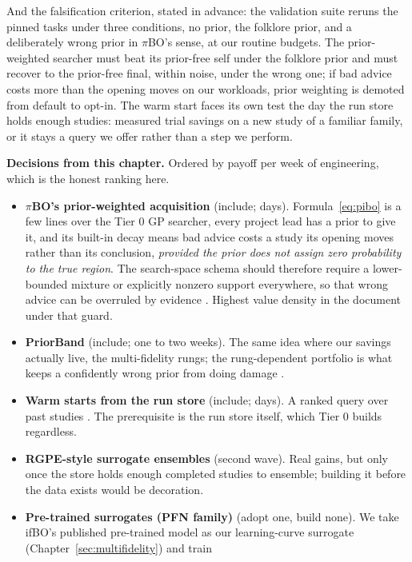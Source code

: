 And the falsification criterion, stated in advance: the validation
suite reruns the pinned tasks under three conditions, no prior, the
folklore prior, and a deliberately wrong prior in $\pi$BO's sense,
at our routine budgets. The prior-weighted searcher must beat its
prior-free self under the folklore prior and must recover to the
prior-free final, within noise, under the wrong one; if bad advice
costs more than the opening moves on our workloads, prior weighting
is demoted from default to opt-in. The warm start faces its own
test the day the run store holds enough studies: measured trial
savings on a new study of a familiar family, or it stays a query we
offer rather than a step we perform.

\begin{decisions}
\noindent\textbf{Decisions from this chapter.} Ordered by payoff per
week of engineering, which is the honest ranking here.
\begin{itemize}[leftmargin=1.3em, itemsep=2pt]
\item \textbf{$\pi$BO's prior-weighted acquisition} (include; days).
Formula~\eqref{eq:pibo} is a few lines over the Tier 0 GP searcher,
every project lead has a prior to give it, and its built-in decay
means bad advice costs a study its opening moves rather than its
conclusion, \emph{provided the prior does not assign zero probability
to the true region}. The search-space schema should therefore require
a lower-bounded mixture or explicitly nonzero support everywhere, so
that wrong advice can be overruled by evidence \citep{hvarfner2022pibo}.
Highest value density in the document under that guard.
\item \textbf{PriorBand} (include; one to two weeks). The same idea
where our savings actually live, the multi-fidelity rungs; the
rung-dependent portfolio is what keeps a confidently wrong prior from
doing damage \citep{mallik2023priorband}.
\item \textbf{Warm starts from the run store} (include; days). A
ranked query over past studies \citep{feurer2015metalearning}. The
prerequisite is the run store itself, which Tier 0 builds regardless.
\item \textbf{RGPE-style surrogate ensembles} (second wave). Real
gains, but only once the store holds enough completed studies to
ensemble; building it before the data exists would be decoration.
\item \textbf{Pre-trained surrogates (PFN family)} (adopt one, build
none). We take ifBO's published pre-trained model as our
learning-curve surrogate (Chapter~\ref{sec:multifidelity}) and train

\end{itemize}
\end{decisions}
